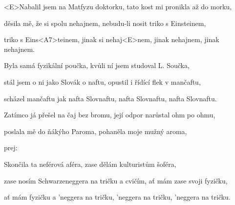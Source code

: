 

\zs
<E>Nabalil jsem na Matfyzu doktorku,
tato kost mi pronikla až do morku,

děsila mě, že si spolu nehajnem,
nebudu-li nosit triko s Einsteinem,

triko s Eins<A7>teinem, jinak si nehaj<E>nem,
jinak nehajnem, jinak nehajnem.
\ks

\zs
Byla samá fyzikální poučka,
kvůli ní jsem studoval L. Součka,

stál jsem o ni jako Slovák o naftu,
opustil i řídící flek v mančaftu,

scházel mančaftu jak nafta Slovnaftu,
nafta Slovnaftu, nafta Slovnaftu.
\ks

\zs
Zatímco já přešel na čaj bez bromu,
její odpor narůstal ohm po ohmu,

poslala mě do ňákýho Paroma,
pohaněla moje mužný aroma,

prej: 
\ks

\zs
Skončila ta neférová aféra,
zase dělám kulturistům šoféra,

zase nosím Schwarzeneggera na tričku
a cvičím, ať mám zase svoji fyzičku,

ať mám fyzičku a 'neggera na tričku,
'neggera na tričku, 'neggera na tričku.
\ks

\kp
